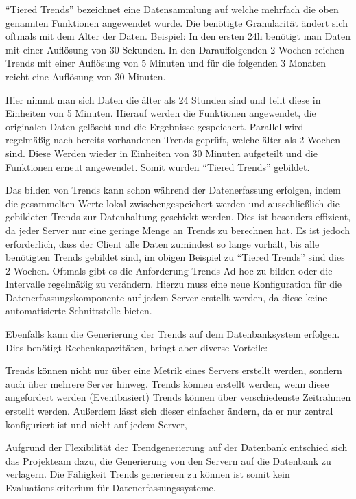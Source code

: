 ``Tiered Trends'' bezeichnet eine Datensammlung auf welche mehrfach die oben
genannten Funktionen angewendet wurde. Die benötigte Granularität ändert sich
oftmals mit dem Alter der Daten. Beispiel: In den ersten 24h benötigt man Daten
mit einer Auflösung von 30 Sekunden. In den Darauffolgenden 2 Wochen reichen
Trends mit einer Auflösung von 5 Minuten und für die folgenden 3 Monaten reicht
eine Auflösung von 30 Minuten.

Hier nimmt man sich Daten die älter als 24 Stunden sind und teilt diese in
Einheiten von 5 Minuten. Hierauf werden die Funktionen angewendet, die
originalen Daten gelöscht und die Ergebnisse gespeichert. Parallel wird
regelmäßig nach bereits vorhandenen Trends geprüft, welche älter als 2 Wochen
sind. Diese Werden wieder in Einheiten von 30 Minuten aufgeteilt und die
Funktionen erneut angewendet. Somit wurden ``Tiered Trends'' gebildet.

Das bilden von Trends kann schon während der Datenerfassung erfolgen, indem die
gesammelten Werte lokal zwischengespeichert werden und ausschließlich die
gebildeten Trends zur Datenhaltung geschickt werden. Dies ist besonders
effizient, da jeder Server nur eine geringe Menge an Trends zu berechnen hat.
Es ist jedoch erforderlich, dass der Client alle Daten zumindest so lange
vorhält, bis alle benötigten Trends gebildet sind, im obigen Beispiel zu
``Tiered Trends'' sind dies 2 Wochen. Oftmals gibt es die Anforderung Trends
Ad hoc zu bilden oder die Intervalle regelmäßig zu verändern. Hierzu muss eine
neue Konfiguration für die Datenerfassungskomponente auf jedem Server erstellt
werden, da diese keine automatisierte Schnittstelle bieten.

Ebenfalls kann die Generierung der Trends auf dem Datenbanksystem erfolgen.
Dies benötigt Rechenkapazitäten, bringt aber diverse Vorteile:

\begin{outline}
  \1 Trends können nicht nur über eine Metrik eines Servers erstellt werden,
  sondern auch über mehrere Server hinweg.
  \1 Trends können erstellt werden, wenn diese angefordert werden
  (Eventbasiert)
  \1 Trends können über verschiedenste Zeitrahmen erstellt werden. Außerdem
  lässt sich dieser einfacher ändern, da er nur zentral konfiguriert ist und
  nicht auf jedem Server,
\end{outline}

Aufgrund der Flexibilität der Trendgenerierung auf der Datenbank entschied sich
das Projekteam dazu, die Generierung von den Servern auf die Datenbank zu
verlagern. Die Fähigkeit Trends generieren zu können ist somit kein
Evaluationskriterium für Datenerfassungssysteme.

